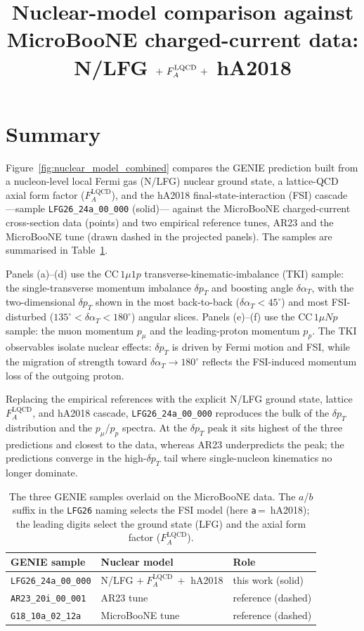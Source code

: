 \documentclass[11pt]{article}
\title{Nuclear-model comparison against MicroBooNE charged-current data:\\
       N/LFG $+\ \FALQCD\ +$ hA2018}
\author{}
\date{}
\newcommand{\dpt}{\delta p_{T}}
\newcommand{\dat}{\delta\alpha_{T}}
\newcommand{\FALQCD}{F_{A}^{\mathrm{LQCD}}}
\begin{document}
\maketitle

\section*{Summary}

Figure~\ref{fig:nuclear_model_combined} compares the GENIE prediction built from
a nucleon-level local Fermi gas (N/LFG) nuclear ground state, a lattice-QCD axial
form factor ($\FALQCD$), and the hA2018 final-state-interaction (FSI) cascade
---sample \texttt{LFG26\_24a\_00\_000} (solid)--- against the MicroBooNE
charged-current cross-section data (points) and two empirical reference tunes,
AR23 and the MicroBooNE tune (drawn dashed in the projected panels). The samples
are summarised in Table~\ref{tab:samples}.

Panels (a)--(d) use the CC\,$1\mu1p$ transverse-kinematic-imbalance (TKI) sample:
the single-transverse momentum imbalance $\dpt$ and boosting angle $\dat$, with
the two-dimensional $\dpt$ shown in the most back-to-back ($\dat<45^{\circ}$) and
most FSI-disturbed ($135^{\circ}<\dat<180^{\circ}$) angular slices. Panels
(e)--(f) use the CC\,$1\mu Np$ sample: the muon momentum $p_{\mu}$ and the
leading-proton momentum $p_{p}$. The TKI observables isolate nuclear effects:
$\dpt$ is driven by Fermi motion and FSI, while the migration of strength toward
$\dat\!\to\!180^{\circ}$ reflects the FSI-induced momentum loss of the outgoing
proton.

Replacing the empirical references with the explicit N/LFG ground state, lattice
$\FALQCD$, and hA2018 cascade, \texttt{LFG26\_24a\_00\_000} reproduces the bulk of
the $\dpt$ distribution and the $p_{\mu}$/$p_{p}$ spectra. At the $\dpt$ peak it
sits highest of the three predictions and closest to the data, whereas AR23
underpredicts the peak; the predictions converge in the high-$\dpt$ tail where
single-nucleon kinematics no longer dominate.

\begin{table}[h]
\centering
\begin{tabular}{lll}
\toprule
GENIE sample & Nuclear model & Role \\
\midrule
\texttt{LFG26\_24a\_00\_000} & N/LFG $+\ \FALQCD\ +$ hA2018 & this work (solid) \\
\texttt{AR23\_20i\_00\_001}  & AR23 tune                    & reference (dashed) \\
\texttt{G18\_10a\_02\_12a}   & MicroBooNE tune              & reference (dashed) \\
\bottomrule
\end{tabular}
\caption{The three GENIE samples overlaid on the MicroBooNE data. The $a$/$b$
suffix in the \texttt{LFG26} naming selects the FSI model (here \texttt{a}\,=\,
hA2018); the leading digits select the ground state (LFG) and the axial form
factor ($\FALQCD$).}
\label{tab:samples}
\end{table}
\end{document}
